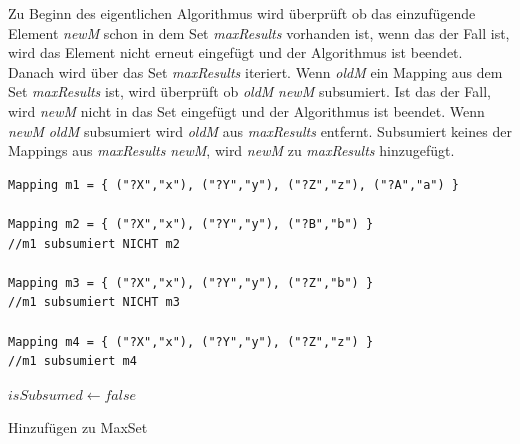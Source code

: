 \documentclass[draft,final]{vutinfth} %
\begin{document}
Zu Beginn des eigentlichen Algorithmus wird überprüft ob das einzufügende Element \textit{newM} schon in dem Set \textit{maxResults} vorhanden ist, wenn das der Fall ist, wird das Element nicht erneut eingefügt und der Algorithmus ist beendet. Danach wird über das Set \textit{maxResults} iteriert. Wenn \textit{oldM} ein Mapping aus dem Set \textit{maxResults} ist, wird überprüft ob \textit{oldM} \textit{newM} subsumiert. Ist das der Fall, wird \textit{newM} nicht in das Set eingefügt und der Algorithmus ist beendet. Wenn \textit{newM} \textit{oldM} subsumiert wird \textit{oldM} aus \textit{maxResults} entfernt. Subsumiert keines der Mappings aus \textit{maxResults} \textit{newM}, wird \textit{newM} zu \textit{maxResults} hinzugefügt.

\begin{lstlisting}[float,caption={Beispiel für Subsumierung},frame=single,label={subsumBsp}]
Mapping m1 = { ("?X","x"), ("?Y","y"), ("?Z","z"), ("?A","a") }

Mapping m2 = { ("?X","x"), ("?Y","y"), ("?B","b") }
//m1 subsumiert NICHT m2

Mapping m3 = { ("?X","x"), ("?Y","y"), ("?Z","b") }
//m1 subsumiert NICHT m3

Mapping m4 = { ("?X","x"), ("?Y","y"), ("?Z","z") }
//m1 subsumiert m4
\end{lstlisting}

\begin{algorithm}
\BlankLine
$isSubsumed\leftarrow false$\;
\BlankLine
{}
\caption{Hinzufügen zu MaxSet}\label{alg:max}
\end{algorithm}
\end{document}
